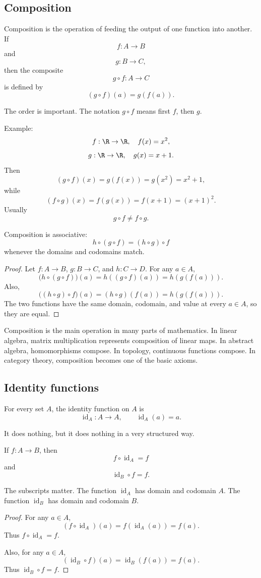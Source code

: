 \subsection{Composition}

Composition is the operation of feeding the output of one function into another. If
\[
f:A\to B
\]
and
\[
g:B\to C,
\]
then the composite
\[
g\circ f:A\to C
\]
is defined by
\[
(g\circ f)(a)=g(f(a)).
\]

The order is important. The notation $g\circ f$ means first $f$, then $g$.

Example:
\[
f:\R\to\R,\quad f(x)=x^2,
\]
\[
g:\R\to\R,\quad g(x)=x+1.
\]
Then
\[
(g\circ f)(x)=g(f(x))=g(x^2)=x^2+1,
\]
while
\[
(f\circ g)(x)=f(g(x))=f(x+1)=(x+1)^2.
\]
Usually
\[
g\circ f\neq f\circ g.
\]

Composition is associative:
\[
h\circ(g\circ f)=(h\circ g)\circ f
\]
whenever the domains and codomains match.

\begin{proof}
Let $f:A\to B$, $g:B\to C$, and $h:C\to D$. For any $a\in A$,
\[
\bigl(h\circ(g\circ f)\bigr)(a)=h((g\circ f)(a))=h(g(f(a))).
\]
Also,
\[
\bigl((h\circ g)\circ f\bigr)(a)=(h\circ g)(f(a))=h(g(f(a))).
\]
The two functions have the same domain, codomain, and value at every $a\in A$, so they are equal.
\end{proof}

Composition is the main operation in many parts of mathematics. In linear algebra, matrix multiplication represents composition of linear maps. In abstract algebra, homomorphisms compose. In topology, continuous functions compose. In category theory, composition becomes one of the basic axioms.

\subsection{Identity functions}

For every set $A$, the identity function on $A$ is
\[
\operatorname{id}_A:A\to A,\qquad \operatorname{id}_A(a)=a.
\]

It does nothing, but it does nothing in a very structured way.

If $f:A\to B$, then
\[
f\circ \operatorname{id}_A=f
\]
and
\[
\operatorname{id}_B\circ f=f.
\]

The subscripts matter. The function $\operatorname{id}_A$ has domain and codomain $A$. The function $\operatorname{id}_B$ has domain and codomain $B$.

\begin{proof}
For any $a\in A$,
\[
(f\circ\operatorname{id}_A)(a)=f(\operatorname{id}_A(a))=f(a).
\]
Thus $f\circ\operatorname{id}_A=f$.

Also, for any $a\in A$,
\[
(\operatorname{id}_B\circ f)(a)=\operatorname{id}_B(f(a))=f(a).
\]
Thus $\operatorname{id}_B\circ f=f$.
\end{proof}

